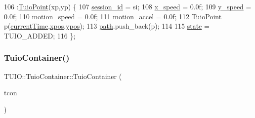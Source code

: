 \begin{DoxyCode}
106                                                    :\hyperlink{class_t_u_i_o_1_1_tuio_point_a8611528cf41b797c51d6a9bf324157a5}{TuioPoint}(xp,yp) \{
107             \hyperlink{class_t_u_i_o_1_1_tuio_container_ab8249dadd0e87ff0b93078b731bec603}{session\_id} = si;
108             \hyperlink{class_t_u_i_o_1_1_tuio_container_a5ee28d0495d5cc4fa331ed0b14b9e176}{x\_speed} = 0.0f;
109             \hyperlink{class_t_u_i_o_1_1_tuio_container_a2499ba8d5c0d8ca4afc3b55ddff4ff1a}{y\_speed} = 0.0f;
110             \hyperlink{class_t_u_i_o_1_1_tuio_container_a7810725234e427d4508f6b6a9874723b}{motion\_speed} = 0.0f;
111             \hyperlink{class_t_u_i_o_1_1_tuio_container_adaa20f12158aee41f7502da330f2a97e}{motion\_accel} = 0.0f;            
112             \hyperlink{class_t_u_i_o_1_1_tuio_point_a8611528cf41b797c51d6a9bf324157a5}{TuioPoint} p(\hyperlink{class_t_u_i_o_1_1_tuio_point_ad04658d52ab78e3e0ddc21584ceaa2ff}{currentTime},\hyperlink{class_t_u_i_o_1_1_tuio_point_a0021f8dfddd05f2a17e713a94f5457e6}{xpos},\hyperlink{class_t_u_i_o_1_1_tuio_point_a89a038775a681166168735dbc95c7779}{ypos});
113             \hyperlink{class_t_u_i_o_1_1_tuio_container_a4bdb8935091e0736b6c19ce9fd676b9a}{path}.push\_back(p);
114             
115             \hyperlink{class_t_u_i_o_1_1_tuio_container_a61cfc66997d3d2f2a503e20bd29ddbf1}{state} = TUIO\_ADDED;
116         \};
\end{DoxyCode}
\mbox{\label{class_t_u_i_o_1_1_tuio_container_acc649d355b9729d0150854e95e1bbef7}} 
\subsubsection{\texorpdfstring{Tuio\+Container()}{TuioContainer()}\hspace{0.1cm}{\footnotesize\ttfamily [3/3]}}
{\footnotesize\ttfamily T\+U\+I\+O\+::\+Tuio\+Container\+::\+Tuio\+Container (\begin{DoxyParamCaption}\item[{\hyperlink{class_t_u_i_o_1_1_tuio_container}{Tuio\+Container} $\ast$}]{tcon }\end{DoxyParamCaption})\hspace{0.3cm}{\ttfamily [inline]}}

